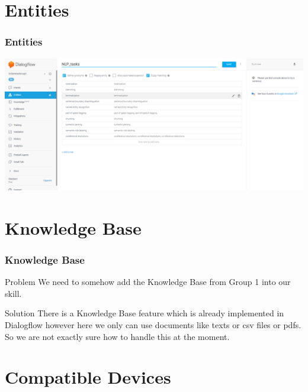 \documentclass{beamer}
\begin{document}

\section{Entities}

\begin{frame}
\frametitle{Entities}
\begin{center}
\includegraphics[scale=0.23]{pictures/entities.png}
\end{center}
\end{frame}


\section{Knowledge Base}

\begin{frame}
\frametitle{Knowledge Base}
\begin{block}{Problem}
We need to somehow add the Knowledge Base from Group 1 into our skill.
\end{block}


\begin{block}{Solution}
There is a Knowledge Base feature which is already implemented in Dialogflow however here we only can use documents like texts or csv files or pdfs. So we are not exactly sure how to handle this at the moment.
\end{block}

\end{frame}


\section{Compatible Devices}
\end{document}
